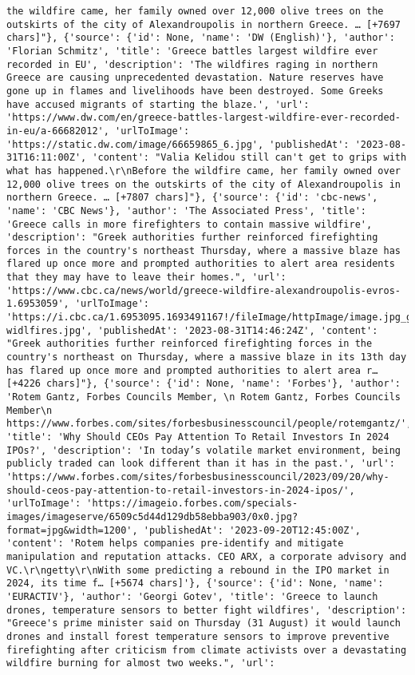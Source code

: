 \documentclass[
  letterpaper,
  DIV=11,
  numbers=noendperiod]{scrartcl}
\begin{document}
\begin{verbatim}
the wildfire came, her family owned over 12,000 olive trees on the outskirts of the city of Alexandroupolis in northern Greece. … [+7697 chars]"}, {'source': {'id': None, 'name': 'DW (English)'}, 'author': 'Florian Schmitz', 'title': 'Greece battles largest wildfire ever recorded in EU', 'description': 'The wildfires raging in northern Greece are causing unprecedented devastation. Nature reserves have gone up in flames and livelihoods have been destroyed. Some Greeks have accused migrants of starting the blaze.', 'url': 'https://www.dw.com/en/greece-battles-largest-wildfire-ever-recorded-in-eu/a-66682012', 'urlToImage': 'https://static.dw.com/image/66659865_6.jpg', 'publishedAt': '2023-08-31T16:11:00Z', 'content': "Valia Kelidou still can't get to grips with what has happened.\r\nBefore the wildfire came, her family owned over 12,000 olive trees on the outskirts of the city of Alexandroupolis in northern Greece. … [+7807 chars]"}, {'source': {'id': 'cbc-news', 'name': 'CBC News'}, 'author': 'The Associated Press', 'title': 'Greece calls in more firefighters to contain massive wildfire', 'description': "Greek authorities further reinforced firefighting forces in the country's northeast Thursday, where a massive blaze has flared up once more and prompted authorities to alert area residents that they may have to leave their homes.", 'url': 'https://www.cbc.ca/news/world/greece-wildfire-alexandroupolis-evros-1.6953059', 'urlToImage': 'https://i.cbc.ca/1.6953095.1693491167!/fileImage/httpImage/image.jpg_gen/derivatives/16x9_620/greece-widlfires.jpg', 'publishedAt': '2023-08-31T14:46:24Z', 'content': "Greek authorities further reinforced firefighting forces in the country's northeast on Thursday, where a massive blaze in its 13th day has flared up once more and prompted authorities to alert area r… [+4226 chars]"}, {'source': {'id': None, 'name': 'Forbes'}, 'author': 'Rotem Gantz, Forbes Councils Member, \n Rotem Gantz, Forbes Councils Member\n https://www.forbes.com/sites/forbesbusinesscouncil/people/rotemgantz/', 'title': 'Why Should CEOs Pay Attention To Retail Investors In 2024 IPOs?', 'description': 'In today’s volatile market environment, being publicly traded can look different than it has in the past.', 'url': 'https://www.forbes.com/sites/forbesbusinesscouncil/2023/09/20/why-should-ceos-pay-attention-to-retail-investors-in-2024-ipos/', 'urlToImage': 'https://imageio.forbes.com/specials-images/imageserve/6509c5d44d129db58ebba903/0x0.jpg?format=jpg&width=1200', 'publishedAt': '2023-09-20T12:45:00Z', 'content': 'Rotem helps companies pre-identify and mitigate manipulation and reputation attacks. CEO ARX, a corporate advisory and VC.\r\ngetty\r\nWith some predicting a rebound in the IPO market in 2024, its time f… [+5674 chars]'}, {'source': {'id': None, 'name': 'EURACTIV'}, 'author': 'Georgi Gotev', 'title': 'Greece to launch drones, temperature sensors to better fight wildfires', 'description': "Greece's prime minister said on Thursday (31 August) it would launch drones and install forest temperature sensors to improve preventive firefighting after criticism from climate activists over a devastating wildfire burning for almost two weeks.", 'url': 
\end{verbatim}
\end{document}
